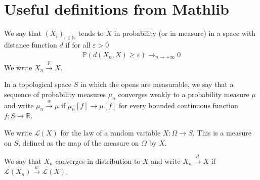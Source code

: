 \chapter{Useful definitions from Mathlib}

\begin{definition}\label{def:cvg_probability}
 \leanok
We say that $(X_i)_{i \in \mathbb{N}}$ tends to $X$ in probability (or in measure) in a space with distance function $d$ if for all $\varepsilon > 0$
\begin{align*}
\mathbb{P}(d(X_n, X) \ge \varepsilon) \to_{n \to +\infty} 0
\end{align*}
We write $X_n \xrightarrow{p} X$.
\end{definition}

\begin{definition}\label{def:weak_cvg_measure}
 \leanok
In a topological space $S$ in which the opens are measurable, we say that a sequence of probability measures $\mu_n$ converges weakly to a probability measure $\mu$ and write $\mu_n \xrightarrow{w} \mu$ if $\mu_n[f] \to \mu[f]$ for every bounded continuous function $f : S \to \mathbb{R}$.
\end{definition}

We write $\mathcal L(X)$ for the law of a random variable $X : \Omega \to S$. This is a measure on $S$, defined as the map of the measure on $\Omega$ by $X$.

\begin{definition}\label{def:cvg_distribution}
We say that $X_n$ converges in distribution to $X$ and write $X_n \xrightarrow{d} X$ if $\mathcal L(X_n) \xrightarrow{w} \mathcal L(X)$.
\end{definition}